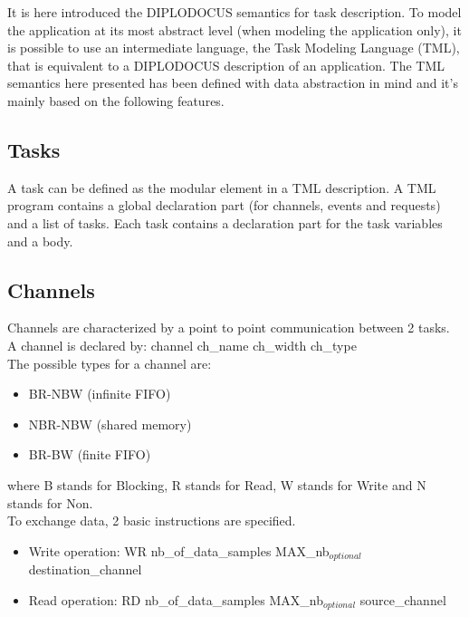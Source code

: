 \documentclass[12pt]{article}
\begin{document}
It is here introduced the DIPLODOCUS semantics for task description. To model the application at its most abstract level (when modeling the application only), it is possible to use an intermediate language, the Task Modeling Language (TML), that is equivalent to a DIPLODOCUS description of an application. The TML semantics here presented has been defined with data abstraction in mind and it's mainly based on the following features. \\ 

\subsection{Tasks}

A task can be defined as the modular element in a TML description. A TML program contains a global declaration part (for channels, events and requests) and a list of tasks. Each task contains a declaration part for the task variables and a body.\\
 

\subsection{Channels}

Channels are characterized by a point to point communication between 2 tasks.\\

A channel is declared by:	channel ch\_name ch\_width  ch\_type\\

The possible types for a channel are: 
 
\begin{itemize}
\item BR-NBW (infinite FIFO)
  
\item NBR-NBW (shared memory) 

\item BR-BW (finite FIFO)

\end{itemize}

\noindent 
where B stands for Blocking, R stands for Read, W stands for Write and N stands for Non.\\


To exchange data, 2 basic instructions are specified.
\begin{itemize}  
\item Write operation: 
WR nb\_of\_data\_samples MAX\_nb$_{optional}$ destination\_channel

\item Read operation:  
RD  nb\_of\_data\_samples MAX\_nb$_{optional}$ source\_channel\\

\end{itemize}
\end{document}
